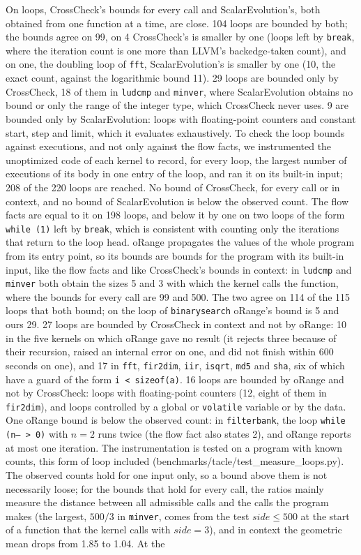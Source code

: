 \documentclass[oneside,english]{amsart}
\numberwithin{equation}{section}
\numberwithin{figure}{section}
\theoremstyle{plain}
\theoremstyle{definition}
\theoremstyle{plain}
\theoremstyle{remark}
\theoremstyle{plain}
\theoremstyle{definition}
\theoremstyle{plain}
\theoremstyle{remark}
\newcommand{\lean}[1]{{\ttfamily\small #1}}
\begin{document}
On loops, CrossCheck's bounds for every call and ScalarEvolution's, both obtained from one function at a time, are close. 104 loops are bounded by both; the bounds agree on 99, on 4 CrossCheck's is smaller by one (loops left by \texttt{break}, where the iteration count is one more than LLVM's backedge-taken count), and on one, the doubling loop of \texttt{fft}, ScalarEvolution's is smaller by one (10, the exact count, against the logarithmic bound 11). 29 loops are bounded only by CrossCheck, 18 of them in \texttt{ludcmp} and \texttt{minver}, where ScalarEvolution obtains no bound or only the range of the integer type, which CrossCheck never uses. 9 are bounded only by ScalarEvolution: loops with floating-point counters and constant start, step and limit, which it evaluates exhaustively. To check the loop bounds against executions, and not only against the flow facts, we instrumented the unoptimized code of each kernel to record, for every loop, the largest number of executions of its body in one entry of the loop, and ran it on its built-in input; 208 of the 220 loops are reached. No bound of CrossCheck, for every call or in context, and no bound of ScalarEvolution is below the observed count. The flow facts are equal to it on 198 loops, and below it by one on two loops of the form \texttt{while (1)} left by \texttt{break}, which is consistent with counting only the iterations that return to the loop head. oRange propagates the values of the whole program from its entry point, so its bounds are bounds for the program with its built-in input, like the flow facts and like CrossCheck's bounds in context: in \texttt{ludcmp} and \texttt{minver} both obtain the sizes 5 and 3 with which the kernel calls the function, where the bounds for every call are 99 and 500. The two agree on 114 of the 115 loops that both bound; on the loop of \texttt{binarysearch} oRange's bound is 5 and ours 29. 27 loops are bounded by CrossCheck in context and not by oRange: 10 in the five kernels on which oRange gave no result (it rejects three because of their recursion, raised an internal error on one, and did not finish within 600 seconds on one), and 17 in \texttt{fft}, \texttt{fir2dim}, \texttt{iir}, \texttt{isqrt}, \texttt{md5} and \texttt{sha}, six of which have a guard of the form \texttt{i < sizeof(a)}. 16 loops are bounded by oRange and not by CrossCheck: loops with floating-point counters (12, eight of them in \texttt{fir2dim}), and loops controlled by a global or \texttt{volatile} variable or by the data. One oRange bound is below the observed count: in \texttt{filterbank}, the loop \texttt{while (n-- > 0)} with $n = 2$ runs twice (the flow fact also states 2), and oRange reports at most one iteration. The instrumentation is tested on a program with known counts, this form of loop included (\lean{benchmarks/tacle/test\_measure\_loops.py}). The observed counts hold for one input only, so a bound above them is not necessarily loose; for the bounds that hold for every call, the ratios mainly measure the distance between all admissible calls and the calls the program makes (the largest, $500/3$ in \texttt{minver}, comes from the test $\mathit{side} \le 500$ at the start of a function that the kernel calls with $\mathit{side} = 3$), and in context the geometric mean drops from 1.85 to 1.04. At the 
\end{document}
